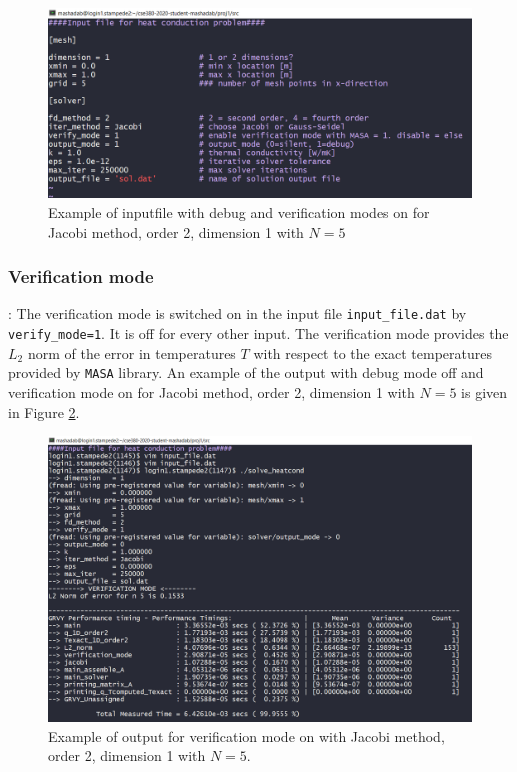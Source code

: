\documentclass[12pt]{amsart}   %
\begin{document}
\begin{figure}[htbp!]
\hspace{-3cm}
    \includegraphics[width=1.3\linewidth]{Project1photos/inputfile.png}
    \caption{Example of inputfile with debug and verification modes on for Jacobi method, order 2, dimension 1 with $N=5$}
    \label{fig:3}
\end{figure}

\subsubsection{Verification mode}:
The verification mode is switched on in the input file {\tt{input\_file.dat}} by {\tt{verify\_mode=1}}. It is off for every other input. The verification mode provides the $L_2$ norm of the error in temperatures $T$ with respect to the exact temperatures provided by {\tt{MASA}} library. An example of the output with debug mode off and verification mode on for Jacobi method, order 2, dimension 1 with $N=5$ is given in Figure \ref{fig:4}.

\begin{figure}[htbp!]
\centering
    \includegraphics[width=1.3\linewidth]{Project1photos/verification.png}
    \caption{Example of output for verification mode on with Jacobi method, order 2, dimension 1 with $N=5$.}
    \label{fig:4}
\end{figure}
\end{document}
